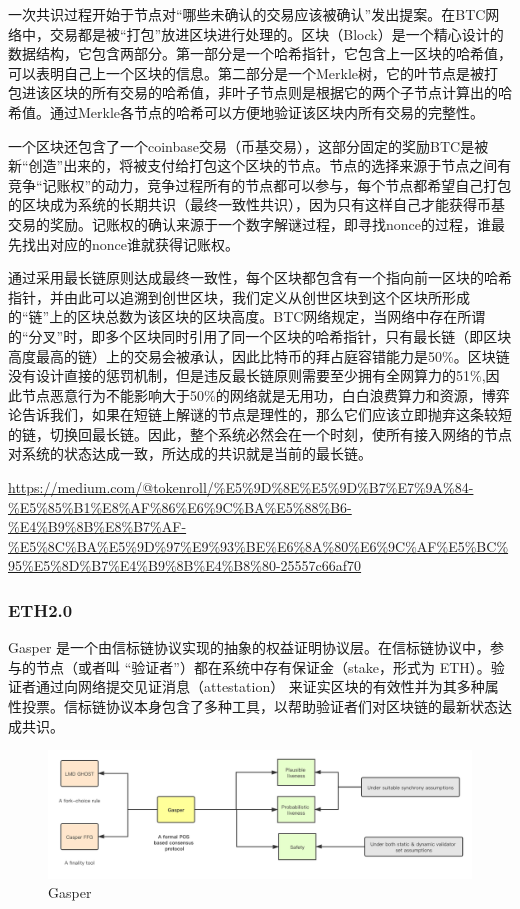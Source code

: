 \documentclass[a4paper,twoside]{scrbook}
\begin{document}
\begin{CJK}{UTF8}{gbsn}
一次共识过程开始于节点对“哪些未确认的交易应该被确认”发出提案。在BTC网络中，交易都是被“打包”放进区块进行处理的。区块（Block）是一个精心设计的数据结构，它包含两部分。第一部分是一个哈希指针，它包含上一区块的哈希值，可以表明自己上一个区块的信息。第二部分是一个Merkle树，它的叶节点是被打包进该区块的所有交易的哈希值，非叶子节点则是根据它的两个子节点计算出的哈希值。通过Merkle各节点的哈希可以方便地验证该区块内所有交易的完整性。

一个区块还包含了一个coinbase交易（币基交易），这部分固定的奖励BTC是被新“创造”出来的，将被支付给打包这个区块的节点。节点的选择来源于节点之间有竞争“记账权”的动力，竞争过程所有的节点都可以参与，每个节点都希望自己打包的区块成为系统的长期共识（最终一致性共识），因为只有这样自己才能获得币基交易的奖励。记账权的确认来源于一个数字解谜过程，即寻找nonce的过程，谁最先找出对应的nonce谁就获得记账权。

通过采用最长链原则达成最终一致性，每个区块都包含有一个指向前一区块的哈希指针，并由此可以追溯到创世区块，我们定义从创世区块到这个区块所形成的“链”上的区块总数为该区块的区块高度。BTC网络规定，当网络中存在所谓的“分叉”时，即多个区块同时引用了同一个区块的哈希指针，只有最长链（即区块高度最高的链）上的交易会被承认，因此比特币的拜占庭容错能力是50\%。区块链没有设计直接的惩罚机制，但是违反最长链原则需要至少拥有全网算力的51\%,因此节点恶意行为不能影响大于50\%的网络就是无用功，白白浪费算力和资源，博弈论告诉我们，如果在短链上解谜的节点是理性的，那么它们应该立即抛弃这条较短的链，切换回最长链。因此，整个系统必然会在一个时刻，使所有接入网络的节点对系统的状态达成一致，所达成的共识就是当前的最长链。

\url{https://medium.com/@tokenroll/%E5%9D%8E%E5%9D%B7%E7%9A%84-%E5%85%B1%E8%AF%86%E6%9C%BA%E5%88%B6-%E4%B9%8B%E8%B7%AF-%E5%8C%BA%E5%9D%97%E9%93%BE%E6%8A%80%E6%9C%AF%E5%BC%95%E5%8D%B7%E4%B9%8B%E4%B8%80-25557c66af70}
\subsubsection{ETH2.0}
Gasper 是一个由信标链协议实现的抽象的权益证明协议层。在信标链协议中，参与的节点（或者叫 “验证者”）都在系统中存有保证金（stake，形式为 ETH）。验证者通过向网络提交见证消息（attestation） 来证实区块的有效性并为其多种属性投票。信标链协议本身包含了多种工具，以帮助验证者们对区块链的最新状态达成共识。

\begin{figure}[!htbp]
\centering
\includegraphics[width=1\textwidth]{Figures/read-gasper.png}
\caption{Gasper} 
\label{fig:Gasper}
\end{figure}


\end{CJK}
\end{document}

